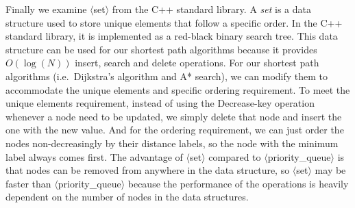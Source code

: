 Finally we examine $\langle$set$\rangle$ from the C++ standard library.
A \emph{set} is a data structure used to store unique elements that follow a specific order.
In the C++ standard library, it is implemented as a red-black binary search tree.
This data structure can be used for our shortest path algorithms because it provides $O(\log(N))$ insert, search and delete operations.
For our shortest path algorithms (i.e.\ Dijkstra's algorithm and A* search),
we can modify them to accommodate the unique elements and specific ordering requirement.
To meet the unique elements requirement,
instead of using the Decrease-key operation whenever a node need to be updated,
we simply delete that node and insert the one with the new value.
And for the ordering requirement,
we can just order the nodes non-decreasingly by their distance labels,
so the node with the minimum label always comes first.
The advantage of $\langle$set$\rangle$ compared to $\langle$priority\_queue$\rangle$ is that nodes can be removed from anywhere in the data structure,
so $\langle$set$\rangle$ may be faster than $\langle$priority\_queue$\rangle$ because the performance of the operations is heavily dependent on the number of nodes in the data structures.

